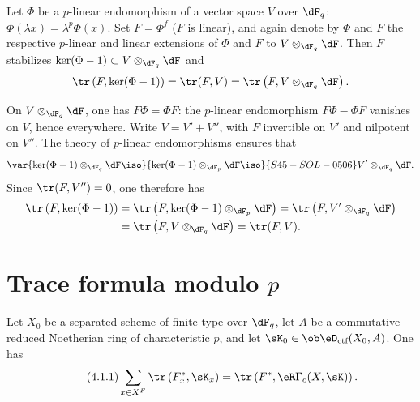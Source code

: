 \begin{lemma_}\label{III:3-8}
Let $\Phi$ be a $p$-linear endomorphism of a vector space $V$ over
$\dF_q$: $\Phi(\lambda x) = \lambda^p\Phi(x)$. Set $F=\Phi^f$ ($F$ is
linear), and again denote by $\Phi$ and $F$ the respective $p$-linear and linear extensions of $\Phi$ and $F$ to $V\otimes_{\dF_q}\dF$. Then $F$ stabilizes
$\ker(\Phi-1)\subset V\otimes_{\dF_q}\dF$ and
\[
  \tr\left(F,\ker(\Phi-1)\right) = \tr(F,V) = \tr\left(F,V\otimes_{\dF_q}\dF\right) \text{.}
\]
\end{lemma_}

On $V\otimes_{\dF_q}\dF$, one has $F\Phi = \Phi F$: the $p$-linear
endomorphism $F\Phi-\Phi F$ vanishes on $V$, hence everywhere. Write
$V=V'+V''$, with $F$ invertible on $V'$ and nilpotent on $V''$. The theory
of $p$-linear endomorphisms ensures that
\[
  \var{\ker(\Phi-1)\otimes_{\dF_q}\dF \iso}{\ker(\Phi-1)\otimes_{\dF_p}\dF \iso}{S45-SOL-0506} V'\otimes_{\dF_q}\dF \text{.}
\]
Since $\tr(F,V'') = 0$, one therefore has
\begin{align*}
  \tr\left(F,\ker(\Phi-1)\right)
    &= \tr\left(F,\ker(\Phi-1)\otimes_{\dF_p}\dF\right) = \tr\left(F,V'\otimes_{\dF_q}\dF\right) \\
    &= \tr\left(F,V\otimes_{\dF_q}\dF\right) = \tr(F,V) \text{.}
\end{align*}











\section{Trace formula modulo \texorpdfstring{$p$}{p}}\label{III:4}






\begin{theorem_}\label{III:4-1}
Let $X_0$ be a separated scheme of finite type over $\dF_q$, let $A$ be a
commutative reduced Noetherian ring of characteristic $p$, and let
$\sK_0\in\ob\eD_\textnormal{ctf}(X_0,A)$. One has
\begin{equation*}\tag{4.1.1}\label{III:eq:4-1-1}
  \sum_{x\in X^F} \tr\left(F_x^*,\sK_x\right) = \tr\left(F^*,\eR\Gamma_c(X,\sK)\right) \text{.}
\end{equation*}
\end{theorem_}






